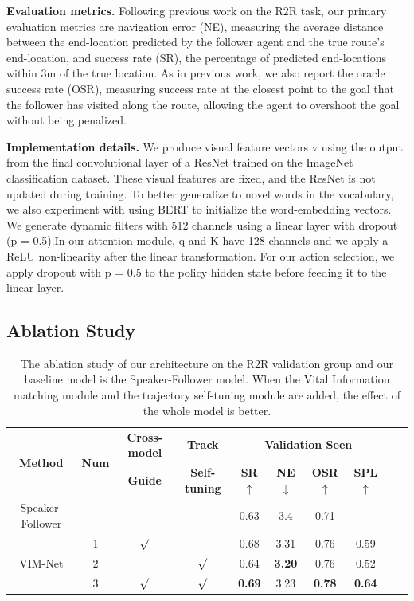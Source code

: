 \textbf{Evaluation metrics.} Following previous work on the R2R task, our primary evaluation metrics are navigation error (NE), measuring the average distance between the end-location predicted by the follower agent and the true route’s end-location, and success rate (SR), the percentage of predicted end-locations within 3m of the true location. As in previous work, we also report the oracle success rate (OSR), measuring success rate at the closest point to the goal that the follower has visited along the route, allowing the agent to overshoot the goal without being penalized.

\textbf{Implementation details.} We produce visual feature vectors v using the output from the final convolutional layer of a ResNet trained on the ImageNet classification dataset. These visual features are fixed, and the ResNet is not updated during training. To better generalize to novel words in the vocabulary, we also experiment with using BERT to initialize the word-embedding vectors. We generate dynamic filters with 512 channels using a linear layer with dropout (p = 0.5).In our attention module, q and K have 128 channels and we apply a ReLU non-linearity after the linear transformation. For our action selection, we apply dropout with p = 0.5 to the policy hidden state before feeding it to the linear layer.
\vspace{-2em}
\subsection{Ablation Study}
\vspace{-2em}

\begin{table}[h]
	\centering
	\caption{The ablation study of our architecture on the R2R validation group and our baseline model is the Speaker-Follower model. When the Vital Information matching module and the trajectory self-tuning module are added, the effect of the whole model is better.}
	{\begin{tabular}[c]{cccccccccc}
			\toprule[1pt]
			\multirow{2}{*}{{\textbf{Method}}} & \multirow{2}{*}{{\textbf{Num}}} & \multicolumn{1}{c}{{\textbf{Cross-model}}}  & \multicolumn{1}{c}{{\textbf{Track}} } &\multicolumn{4}{c}{{\textbf{Validation Seen}}} \\
			
			& &\textbf{Guide} &\textbf{Self-tuning} & \textbf{SR}$\uparrow$ & \textbf{NE}$\downarrow$ & \textbf{OSR}$\uparrow$ & \textbf{SPL}$\uparrow$\\
			\toprule[1pt]
			
			Speaker-Follower   & & & & 0.63 & 3.4 & 0.71 & - \\
			\toprule[1pt]
			\multirow{3}{*}{VIM-Net}  &1& $\surd$ &  & 0.68 &  3.31 &  0.76 & 0.59  \\
			   &2& & $\surd$ & 0.64 & \textbf{3.20} & 0.76 & 0.52  \\
				 &3& $\surd$ & $\surd$ & \textbf{0.69} &  3.23 & \textbf{0.78} & \textbf{0.64} \\
			\bottomrule[1pt]
		\end{tabular}
		\label{table_1}}
\end{table}
\vspace{-2em}

